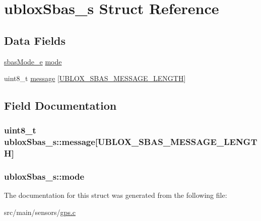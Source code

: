 \hypertarget{structubloxSbas__s}{\section{ublox\+Sbas\+\_\+s Struct Reference}
\label{structubloxSbas__s}
}
\subsection*{Data Fields}
\begin{DoxyCompactItemize}
\item 
\hyperlink{config_2gps_8h_a517917c9a4389dc3fbafd50e9b3f913a}{sbas\+Mode\+\_\+e} \hyperlink{structubloxSbas__s_a89af16a8b623286187d7c967a8690831}{mode}
\item 
uint8\+\_\+t \hyperlink{structubloxSbas__s_ad558e54857fadf422e8ac87ab2c10fd1}{message} \mbox{[}\hyperlink{gps_8c_a0d3154ab8933844ddfc124d2b738451d}{U\+B\+L\+O\+X\+\_\+\+S\+B\+A\+S\+\_\+\+M\+E\+S\+S\+A\+G\+E\+\_\+\+L\+E\+N\+G\+T\+H}\mbox{]}
\end{DoxyCompactItemize}


\subsection{Field Documentation}
\hypertarget{structubloxSbas__s_ad558e54857fadf422e8ac87ab2c10fd1}{
\subsubsection[{message}]{\setlength{\rightskip}{0pt plus 5cm}uint8\+\_\+t ublox\+Sbas\+\_\+s\+::message\mbox{[}{\bf U\+B\+L\+O\+X\+\_\+\+S\+B\+A\+S\+\_\+\+M\+E\+S\+S\+A\+G\+E\+\_\+\+L\+E\+N\+G\+T\+H}\mbox{]}}}\label{structubloxSbas__s_ad558e54857fadf422e8ac87ab2c10fd1}
\hypertarget{structubloxSbas__s_a89af16a8b623286187d7c967a8690831}{
\subsubsection[{mode}]{ ublox\+Sbas\+\_\+s\+::mode}}\label{structubloxSbas__s_a89af16a8b623286187d7c967a8690831}


The documentation for this struct was generated from the following file\+:\begin{DoxyCompactItemize}
\item 
src/main/sensors/\hyperlink{gps_8c}{gps.\+c}\end{DoxyCompactItemize}
